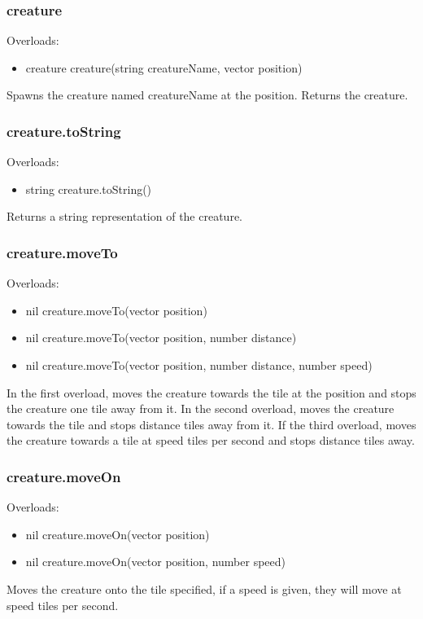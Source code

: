 \documentclass{book}
\newenvironment{ulist}
	{\begin{itemize}
			\itemsep0em}
	{\end{itemize}}
\begin{document}
\subsubsection{creature}
Overloads:
\begin{ulist}
	\item creature creature(string creatureName, vector position)
\end{ulist}
Spawns the creature named creatureName at the position. Returns the creature.

\subsubsection{creature.toString}
Overloads:
\begin{ulist}
	\item string creature.toString()
\end{ulist}
Returns a string representation of the creature.

\subsubsection{creature.moveTo}
Overloads:
\begin{ulist}
	\item nil creature.moveTo(vector position)
	\item nil creature.moveTo(vector position, number distance)
	\item nil creature.moveTo(vector position, number distance, number speed)
\end{ulist}
In the first overload, moves the creature towards the tile at the position and stops the creature one tile away from it. In the second overload, moves the creature towards the tile and stops distance tiles away from it. If the third overload, moves the creature towards a tile at speed tiles per second and stops distance tiles away.

\subsubsection{creature.moveOn}
Overloads:
\begin{ulist}
	\item nil creature.moveOn(vector position)
	\item nil creature.moveOn(vector position, number speed)
\end{ulist}
Moves the creature onto the tile specified, if a speed is given, they will move at speed tiles per second.
\end{document}
